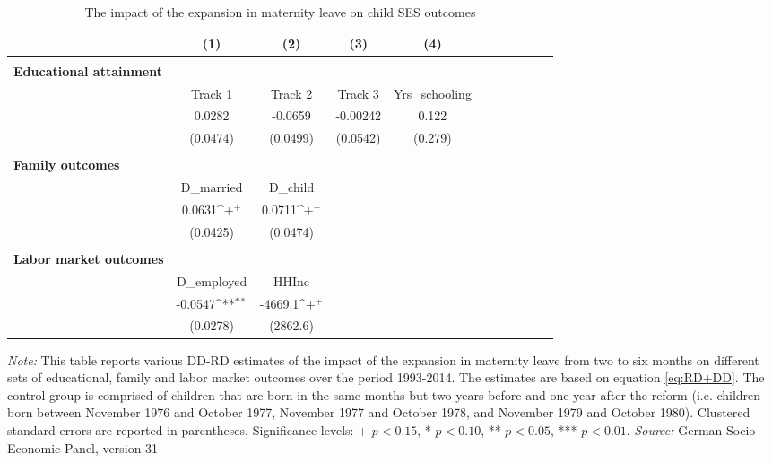 \documentclass[a4paper ]{article}
\begin{document}
\begin{table}[p] \centering
\def\sym#1{\ifmmode^{#1}\else\(^{#1}\)\fi}
\begin{tabular}{l*{10}{c}}
\toprule
	& \multicolumn{1}{c}{(1)} & \multicolumn{1}{c}{(2)} & \multicolumn{1}{c}{(3)} & \multicolumn{1}{c}{(4)} \\
	\midrule
	\\
\textbf{Educational attainment}\\
\midrule
            &\multicolumn{1}{c}{Track 1}&\multicolumn{1}{c}{Track 2}&\multicolumn{1}{c}{Track 3}&\multicolumn{1}{c}{Yrs\_schooling}\\
\midrule
        &      0.0282         &     -0.0659         &    -0.00242         &       0.122  \\       
            &    (0.0474)         &    (0.0499)         &    (0.0542)         &     (0.279)         \\
\\

\textbf{Family outcomes}\\
\midrule
&\multicolumn{1}{c}{D\_married}&\multicolumn{1}{c}{D\_child}\\
\midrule
&      0.0631\sym{+}  &      0.0711\sym{+}  \\
&    (0.0425)         &    (0.0474)        \\
\\
\textbf{Labor market outcomes}\\
\midrule
&\multicolumn{1}{c}{D\_employed}&\multicolumn{1}{c}{HHInc}\\
\midrule
&     -0.0547\sym{**} &     -4669.1\sym{+}  \\
 &    (0.0278)         &    (2862.6)         \\
\bottomrule


\end{tabular}
\caption{The impact of the expansion in maternity leave on child SES outcomes}\label{tab: mechanisms}
\begin{minipage}{\textwidth} %
{\footnotesize \textit{Note:} This table reports various DD-RD estimates of the impact of the expansion in maternity leave from two to six months on different sets of educational, family and labor market outcomes over the period 1993-2014. The estimates are based on equation \ref{eq:RD+DD}. The control group is comprised of children that are born in the same months but two years before and one year after the reform (i.e. children born between November 1976 and October 1977, November 1977 and October 1978, and November 1979 and October 1980). \newline
Clustered standard errors are reported in parentheses. Significance levels: + \(p<0.15\), * \(p<0.10\), ** \(p<0.05\), *** \(p<0.01\). \newline \textit{Source: }German Socio-Economic Panel, version 31\par}
\end{minipage}
\end{table}
\end{document}
